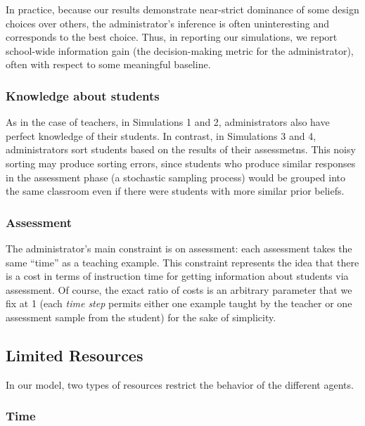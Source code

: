 \documentclass[10pt, letterpaper]{article}
\begin{document}
In practice, because our results demonstrate near-strict dominance of
some design choices over others, the administrator's inference is often
uninteresting and corresponds to the best choice. Thus, in reporting our
simulations, we report school-wide information gain (the decision-making
metric for the administrator), often with respect to some meaningful
baseline.

\subsubsection{Knowledge about students}\label{knowledge-about-students}

As in the case of teachers, in Simulations 1 and 2, administrators also
have perfect knowledge of their students. In contrast, in Simulations 3
and 4, administrators sort students based on the results of their
assessmetns. This noisy sorting may produce sorting errors, since
students who produce similar responses in the assessment phase (a
stochastic sampling process) would be grouped into the same classroom
even if there were students with more similar prior beliefs.

\subsubsection{Assessment}\label{assessment}

The administrator's main constraint is on assessment: each assessment
takes the same ``time'' as a teaching example. This constraint
represents the idea that there is a cost in terms of instruction time
for getting information about students via assessment. Of course, the
exact ratio of costs is an arbitrary parameter that we fix at 1 (each
\emph{time step} permits either one example taught by the teacher or one
assessment sample from the student) for the sake of simplicity.

\subsection{Limited Resources}\label{limited-resources}

In our model, two types of resources restrict the behavior of the
different agents.

\subsubsection{Time}\label{time}
\end{document}
